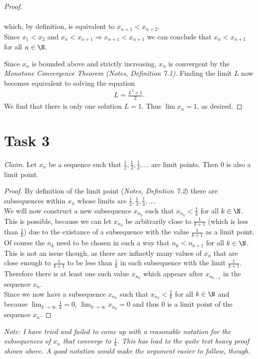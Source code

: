 \documentclass{article}
\begin{document}
\begin{proof}
\begin{adjustwidth}{2em}{0pt}
\begin{claimproof}
\begin{align*}
			\end{align*}
			which, by definition, is equivalent to $x_{n+1}<x_{n+2}$.\\
			Since $x_1<x_2$ and $x_n<x_{n+1}\Rightarrow x_{n+1}<x_{n+1}$ we can conclude that $x_n<x_{n+1}$ for all $n\in\N$.
		\end{claimproof}
	\end{adjustwidth}
	Since $x_n$ is bounded above and strictly increasing, $x_n$ is convergent by the \emph{Monotone Convergence Theorem (Notes, Definition 7.1)}. Finding the limit $L$ now becomes equivalent to solving the equation
	\begin{align*}
		L=\frac{L^2+1}{2}.
	\end{align*}
	We find that there is only one solution $L=1$. Thus $\lim x_n=1$, as desired.
\end{proof}
\section*{Task 3}
\emph{Claim.} Let $x_n$ be a sequence such that $\frac{1}{2}, \frac{1}{3}, \frac{1}{4}, ...$ are limit points. Then $0$ is also a limit point.
\begin{proof}
	By definition of the limit point (\emph{Notes, Defintion 7.2}) there are subsequences within $x_n$ whose limits are $\frac{1}{2}, \frac{1}{3}, \frac{1}{4}, ...$. \\
	We will now construct a new subsequence $x_{n_k}$ such that $x_{n_k}<\frac{1}{k}$ for all $k\in\N$.\\
	This is possible, because we can let $x_{n_k}$ be arbitrarily close to $\frac{1}{k+1}$ (which is less than $\frac{1}{k}$) due to the existance of a subsequence with the value $\frac{1}{k+1}$ as a limit point. Of course the $n_k$ need to be chosen in such a way that $n_k<n_{k+1}$ for all $k\in\N$. This is not an issue though, as there are infinetly many values of $x_n$ that are close enough to $\frac{1}{k+1}$ to be less than $\frac{1}{k}$ in each subsequence with the limit $\frac{1}{k+1}$. Therefore there is at least one such value $x_{n_k}$ which appears after $x_{n_{k-1}}$ in the sequence $x_n$.\\
	Since we now have a subsequence $x_{n_k}$ such that $x_{n_k}<\frac{1}{k}$ for all $k\in\N$ and because $\lim_{k\to\infty} \frac{1}{k} = 0$, $\lim_{k\to\infty} x_{n_k}=0$ and thus $0$ is a limit point of the sequence $x_n$.
\end{proof}
\emph{Note: I have tried and failed to come up with a reasonable notation for the subsequences of $x_n$ that converge to $\frac{1}{k}$. This has lead to the quite text heavy proof shown above. A good notation would make the argument easier to follow, though.}
\end{document}
